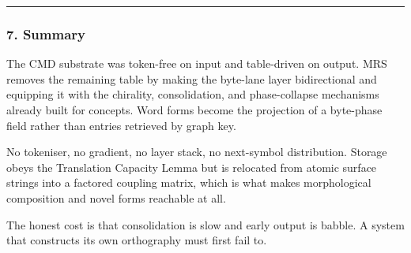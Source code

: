 \documentclass[
  11pt,
  a4paper,
]{article}
\begin{document}
\begin{center}\rule{0.5\linewidth}{0.5pt}\end{center}

\subsubsection{7. Summary}\label{summary-3}

The CMD substrate was token-free on input and table-driven on output.
MRS removes the remaining table by making the byte-lane layer
bidirectional and equipping it with the chirality, consolidation, and
phase-collapse mechanisms already built for concepts. Word forms become
the projection of a byte-phase field rather than entries retrieved by
graph key.

No tokeniser, no gradient, no layer stack, no next-symbol distribution.
Storage obeys the Translation Capacity Lemma but is relocated from
atomic surface strings into a factored coupling matrix, which is what
makes morphological composition and novel forms reachable at all.

The honest cost is that consolidation is slow and early output is
babble. A system that constructs its own orthography must first fail to.
\end{document}
